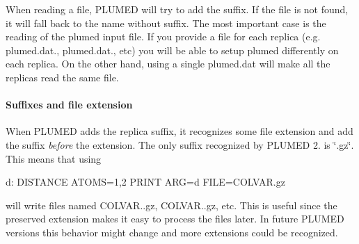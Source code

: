 When reading a file, P\+L\+U\+M\+E\+D will try to add the suffix. If the file is not found, it will fall back to the name without suffix. The most important case is the reading of the plumed input file. If you provide a file for each replica (e.\+g. plumed.\+dat., plumed.\+dat., etc) you will be able to setup plumed differently on each replica. On the other hand, using a single plumed.\+dat will make all the replicas read the same file.\hypertarget{_files_Suffixes-and-file-extension}{}\paragraph{Suffixes and file extension}\label{_files_Suffixes-and-file-extension}
When P\+L\+U\+M\+E\+D adds the replica suffix, it recognizes some file extension and add the suffix {\itshape before} the extension. The only suffix recognized by P\+L\+U\+M\+E\+D 2. is \char`\"{}.\+gz\char`\"{}. This means that using \begin{DoxyVerb}d: DISTANCE ATOMS=1,2
PRINT ARG=d FILE=COLVAR.gz
\end{DoxyVerb}
 will write files named C\+O\+L\+V\+A\+R..\+gz, C\+O\+L\+V\+A\+R..\+gz, etc. This is useful since the preserved extension makes it easy to process the files later. In future P\+L\+U\+M\+E\+D versions this behavior might change and more extensions could be recognized. 